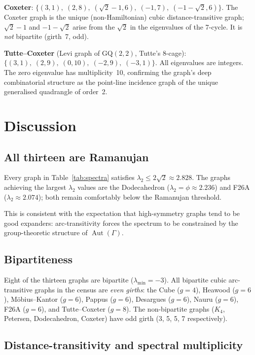 \documentclass[11pt,a4paper]{article}
\DeclareMathOperator{\Aut}{Aut}
\begin{document}
\medskip
\noindent
\textbf{Coxeter}: $\{(3,1),\; (2,8),\; (\sqrt{2}-1,6),\; (-1,7),\; (-1-\sqrt{2},6)\}$.
The Coxeter graph is the unique (non-Hamiltonian) cubic distance-transitive graph; $\sqrt{2}-1$ and $-1-\sqrt{2}$ arise from the $\sqrt{2}$ in the eigenvalues of the 7-cycle. It is \emph{not} bipartite (girth~7, odd).

\medskip
\noindent
\textbf{Tutte--Coxeter} (Levi graph of $\mathrm{GQ}(2,2)$, Tutte's 8-cage): $\{(3,1),\; (2,9),\; (0,10),\; (-2,9),\; (-3,1)\}$. All eigenvalues are integers. The zero eigenvalue has multiplicity~10, confirming the graph's deep combinatorial structure as the point-line incidence graph of the unique generalised quadrangle of order~2.

\section{Discussion}

\subsection{All thirteen are Ramanujan}

Every graph in Table~\ref{tab:spectra} satisfies $\lambda_2 \leq 2\sqrt{2} \approx 2.828$. The graphs achieving the largest $\lambda_2$ values are the Dodecahedron ($\lambda_2 = \phi \approx 2.236$) and F26A ($\lambda_2 \approx 2.074$); both remain comfortably below the Ramanujan threshold.

This is consistent with the expectation that high-symmetry graphs tend to be good expanders: arc-transitivity forces the spectrum to be constrained by the group-theoretic structure of $\Aut(\Gamma)$.

\subsection{Bipartiteness}

Eight of the thirteen graphs are bipartite ($\lambda_{\min} = -3$). All bipartite cubic arc-transitive graphs in the census are \emph{even girths}: the Cube ($g=4$), Heawood ($g=6$), M\"{o}bius--Kantor ($g=6$), Pappus ($g=6$), Desargues ($g=6$), Nauru ($g=6$), F26A ($g=6$), and Tutte--Coxeter ($g=8$). The non-bipartite graphs ($K_4$, Petersen, Dodecahedron, Coxeter) have odd girth (3, 5, 5, 7 respectively).

\subsection{Distance-transitivity and spectral multiplicity}
\end{document}
